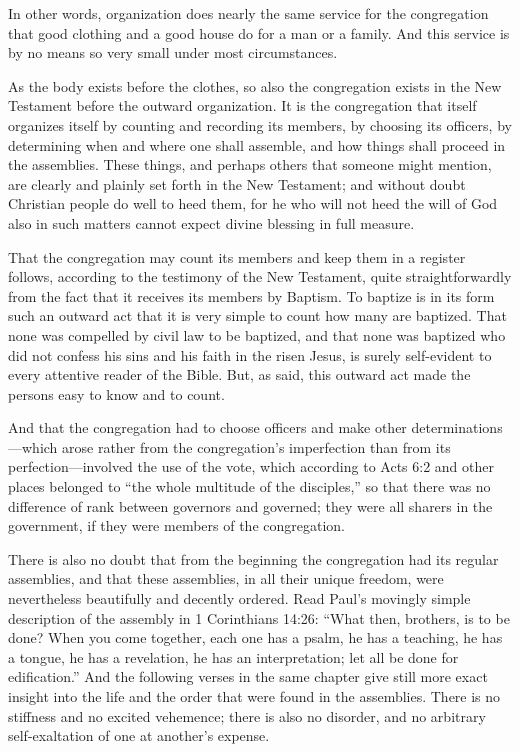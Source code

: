 In other words, organization does nearly the same service for the congregation that good clothing and a good house do for a man or a family. And this service is by no means so very small under most circumstances.

As the body exists before the clothes, so also the congregation exists in the New Testament before the outward organization. It is the congregation that itself organizes itself by counting and recording its members, by choosing its officers, by determining when and where one shall assemble, and how things shall proceed in the assemblies. These things, and perhaps others that someone might mention, are clearly and plainly set forth in the New Testament; and without doubt Christian people do well to heed them, for he who will not heed the will of God also in such matters cannot expect divine blessing in full measure.

That the congregation may count its members and keep them in a register follows, according to the testimony of the New Testament, quite straightforwardly from the fact that it receives its members by Baptism. To baptize is in its form such an outward act that it is very simple to count how many are baptized. That none was compelled by civil law to be baptized, and that none was baptized who did not confess his sins and his faith in the risen Jesus, is surely self-evident to every attentive reader of the Bible. But, as said, this outward act made the persons easy to know and to count.

And that the congregation had to choose officers and make other determinations—which arose rather from the congregation’s imperfection than from its perfection—involved the use of the vote, which according to Acts 6:2 and other places belonged to “the whole multitude of the disciples,” so that there was no difference of rank between governors and governed; they were all sharers in the government, if they were members of the congregation.

There is also no doubt that from the beginning the congregation had its regular assemblies, and that these assemblies, in all their unique freedom, were nevertheless beautifully and decently ordered. Read Paul’s movingly simple description of the assembly in 1 Corinthians 14:26: “What then, brothers, is to be done? When you come together, each one has a psalm, he has a teaching, he has a tongue, he has a revelation, he has an interpretation; let all be done for edification.” And the following verses in the same chapter give still more exact insight into the life and the order that were found in the assemblies. There is no stiffness and no excited vehemence; there is also no disorder, and no arbitrary self-exaltation of one at another’s expense.

